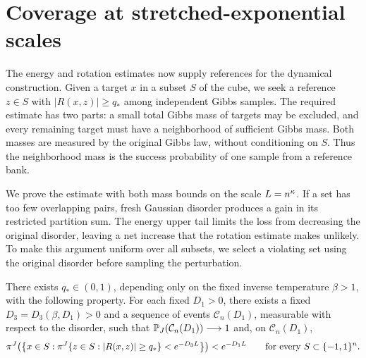 \section{Coverage at stretched-exponential scales}
\label{sec:coverage}

The energy and rotation estimates now supply references for the dynamical
construction. Given a target $x$ in a subset $S$ of the cube, we seek a
reference $z\in S$ with $|R(x,z)|\ge q_*$ among independent Gibbs samples.
The required estimate has two parts: a small total Gibbs mass of targets
may be excluded, and every remaining target must have a neighborhood of
sufficient Gibbs mass. Both masses are measured by the original Gibbs
law, without conditioning on $S$. Thus the neighborhood mass is the
success probability of one sample from a reference bank.

We prove the estimate with both mass bounds on the scale $L=n^\kappa$.
If a set has too few overlapping pairs, fresh Gaussian disorder produces
a gain in its restricted partition sum. The energy upper tail limits
the loss from decreasing the original disorder, leaving a net increase
that the rotation estimate makes unlikely. To make this argument uniform
over all subsets, we select a violating set using the original disorder
before sampling the perturbation.

\begin{proposition}
\label{prop:coverage}
There exists $q_*\in(0,1)$, depending only on the fixed inverse
temperature $\beta>1$, with the following property.  For each fixed
$D_1>0$, there exists a fixed $D_3=D_3(\beta,D_1)>0$ and a sequence of
events $\mathcal C_n(D_1)$, measurable with respect to the disorder,
such that $\mathbb P_J(\mathcal C_n(D_1))\longrightarrow1$ and, on
$\mathcal C_n(D_1)$,
\begin{equation}
 \pi^J\!\left(
   \left\{x\in S:
     \pi^J\{z\in S:|R(x,z)|\ge q_*\}<e^{-D_3L}
   \right\}\right)
 <e^{-D_1L}
 \qquad\text{for every }S\subset\{-1,1\}^n.
 \label{eq:coverage}
\end{equation}
\end{proposition}

